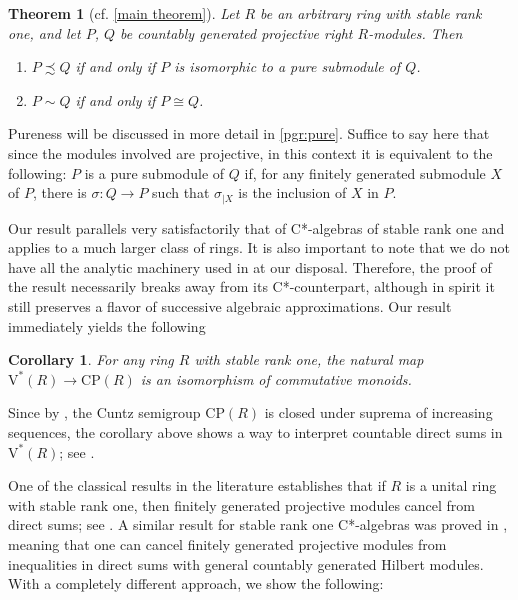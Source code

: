 \documentclass[11pt]{amsart}
\numberwithin{equation}{section}
\theoremstyle{definition}
\newcommand{\V}{\mathrm{V}}
\newcommand{\CP}{\mathrm{CP}}
\theoremstyle{plain}
\newcounter{thmintroctr}
\newtheorem{thmintro}[thmintroctr]{Theorem}
\newtheorem{corintro}[thmintroctr]{Corollary}
\theoremstyle{definition}
\begin{document}
\begin{thmintro}[cf. \ref{main theorem}]
\label{thmintroA}
Let $R$ be an arbitrary ring with stable rank one, and let $P$, $Q$ be countably generated projective right $R$-modules. Then
\begin{enumerate}[label=\rm{(\roman*)}]
    \item $P\precsim Q$ if and only if $P$ is isomorphic to a pure submodule of $Q$.
    \item $P\sim Q$ if and only if $P\cong Q$.
\end{enumerate}
\end{thmintro}
Pureness will be discussed in more detail in \autoref{pgr:pure}. Suffice to say here that since the modules involved are projective, in this context it is equivalent to the following: $P$ is a pure submodule of $Q$ if, for any finitely generated submodule $X$ of $P$, there is $\sigma\colon Q\to P$ such that $\sigma_{|X}$ is the inclusion of $X$ in $P$.

Our result parallels very satisfactorily that of C*-algebras of stable rank one and applies to a much larger class of rings. It is also important to note that we do not have all the analytic machinery used in \cite{CowEllIva08CuInv} at our disposal. Therefore, the proof of the result necessarily breaks away from its C*-counterpart, although in spirit it still preserves a flavor of successive algebraic approximations. Our result immediately yields the following
\begin{corintro}
For any ring $R$ with stable rank one, the natural map $\V^*(R)\to\CP(R)$ is an isomorphism of commutative monoids. 
\end{corintro}
Since by \cite[Lemma~4.3, Theorem~4.10]{AntAraBosPerVil25}, the Cuntz semigroup $\CP(R)$ is closed under suprema of increasing sequences, the corollary above shows a way to interpret countable direct sums in $\V^*(R)$; see \cite{nazsme24monoid}. %

One of the classical results in the literature establishes that if $R$ is a unital ring with stable rank one, then finitely generated projective modules cancel from direct sums; see \cite[Theorem 2]{Evans1973}. A similar result for stable rank one C*-algebras was proved in \cite[Proposition 4.2]{RorWin10ZRevisited}, meaning that one can cancel finitely generated projective modules from inequalities in direct sums with general countably generated Hilbert modules. With a completely different approach, we show the following:
\end{document}
